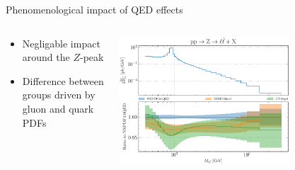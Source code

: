 \documentclass[aspectratio=169, 8pt,t]{beamer}
\begin{document}
\begin{frame}{Phenomenological impact of QED effects}
\begin{columns}[T]
\begin{column}{0.49\textwidth}
\begin{itemize}
        \item Negligable impact around the $Z$-peak
        \item Difference between groups driven by gluon and quark PDFs
      \end{itemize}
    \end{column}
    \begin{column}{0.49\textwidth}
      \vspace*{-3em}
      \includegraphics[width=0.7\textwidth]{figures/NNPDF_DY_14TEV_40_PHENO-global.pdf}
    \end{column}
  \end{columns}
\end{frame}
\end{document}
